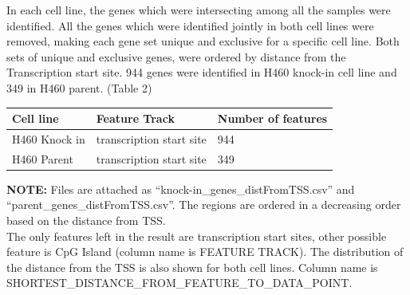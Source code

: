 \documentclass[11pt]{article}
\begin{document}


In each cell line, the genes which were intersecting among all the samples were identified. All the genes which were identified jointly in both cell lines were removed, making each gene set unique and exclusive for a specific cell line. Both sets of unique and exclusive genes, were ordered by distance from the Transcription start site. 944 genes were identified in H460 knock-in cell line and 349 in H460 parent. (Table 2)



\begin{table}[H]
\centering
	\begin{tabular}{|l|l|l|}
	\hline
		Cell line & Feature Track & Number of features \\ \hline
		H460 Knock in & transcription start site & 944 \\ \hline
		H460 Parent & transcription start site & 349 \\ \hline
	\end{tabular}
\end{table}

{\bf NOTE:}  Files are attached as “knock-in\_genes\_distFromTSS.csv” and “parent\_genes\_distFromTSS.csv”. The regions are ordered in a decreasing order based on the distance from TSS. \\


The only features left in the result are transcription start sites, other possible feature is CpG Island (column name  is  FEATURE TRACK). The distribution of the distance from the TSS is also shown for both cell lines. Column name is SHORTEST\_DISTANCE\_FROM\_FEATURE\_TO\_DATA\_POINT.\\
\end{document}
